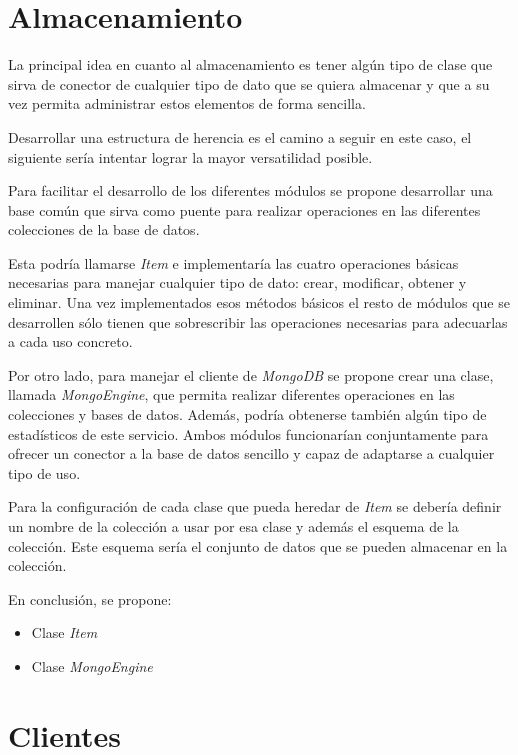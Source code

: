 \section{Almacenamiento}

La principal idea en cuanto al almacenamiento es tener algún tipo de clase que sirva de conector de cualquier tipo de dato que se quiera almacenar y que a su vez permita administrar estos elementos de forma sencilla.

Desarrollar una estructura de herencia es el camino a seguir en este caso, el siguiente sería intentar lograr la mayor versatilidad posible.

Para facilitar el desarrollo de los diferentes módulos se propone desarrollar una base común que sirva como puente para realizar operaciones en las diferentes colecciones de la base de datos.

Esta podría llamarse \textit{Item} e implementaría las cuatro operaciones básicas necesarias para manejar cualquier tipo de dato: crear, modificar, obtener y eliminar. Una vez implementados esos métodos básicos el resto de módulos que se desarrollen sólo tienen que sobrescribir las operaciones necesarias para adecuarlas a cada uso concreto.

Por otro lado, para manejar el cliente de \textit{MongoDB} se propone crear una clase, llamada \textit{MongoEngine}, que permita realizar diferentes operaciones en las colecciones y bases de datos. Además, podría obtenerse también algún tipo de estadísticos de este servicio. Ambos módulos funcionarían conjuntamente para ofrecer un conector a la base de datos sencillo y capaz de adaptarse a cualquier tipo de uso.

Para la configuración de cada clase que pueda heredar de \textit{Item} se debería definir un nombre de la colección a usar por esa clase y además el esquema de la colección. Este esquema sería el conjunto de datos que se pueden almacenar en la colección.


\bigskip
En conclusión, se propone:
\begin{itemize}
	\item Clase \textit{Item}
	\item Clase \textit{MongoEngine}
\end{itemize}



\section{Clientes}
\label{sec:clientcap6}

